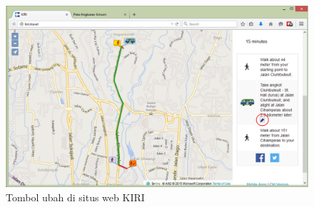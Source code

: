 \begin{figure}
	\centering
	\includegraphics[scale=0.5]{Gambar/4_tombolubah}
	\caption{Tombol ubah di situs web KIRI} 
	\label{fig:4_tombolubah}
\end{figure}
